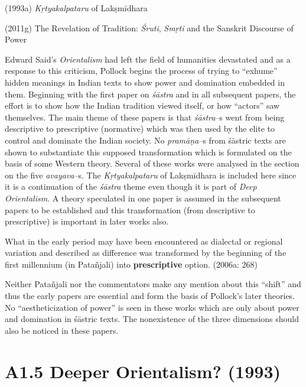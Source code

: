 (1993a) \textit{Kṛtyakalpataru} of Lakṣmīdhara

(2011g) The Revelation of Tradition: \textit{Śruti}, \textit{Smṛti} and the Sanskrit Discourse of Power

Edward Said’s \textit{Orientalism} had left the field of humanities devastated and as a response to this criticism, Pollock begins the process of trying to “exhume” hidden meanings in Indian texts to show power and domination embedded in them. Beginning with the first paper on \textit{śāstra} and in all subsequent papers, the effort is to show how the Indian tradition viewed itself, or how “actors” saw themselves. The main theme of these papers is that \textit{śāstra}–s went from being descriptive to prescriptive (normative) which was then used by the elite to control and dominate the Indian society. No \textit{pramāṇa}–s from śāstric texts are shown to substantiate this supposed transformation which is formulated on the basis of some Western theory. Several of these works were analysed in the section on the five \textit{avayava}–s\break [4.6]. The \textit{Kṛtyakalpataru} of Lakṣmīdhara is included here since it is a continuation of the \textit{śāstra} theme even though it is part of \textit{Deep Orientalism}. A theory speculated in one paper is assumed in the subsequent papers to be established and this transformation (from descriptive to prescriptive) is important in later works also.

\begin{myquote}
What in the early period may have been encountered as dialectal or regional variation and described as difference was transformed by the beginning of the ﬁrst millennium (in Patañjali) into \textbf{prescriptive} option. (2006a: 268)
\end{myquote}

Neither Patañjali nor the commentators make any mention about this “shift” and thus the early papers are essential and form the basis of Pollock’s later theories. No “aestheticization of power” is seen in these works which are only about power and domination in śāstric texts. The nonexistence of the three dimensions should also be noticed in these papers.


\section*{A1.5 Deeper Orientalism? (1993)}

